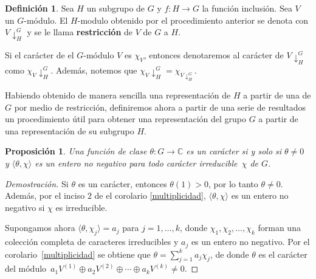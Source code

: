 \documentclass[12pt]{book}
\newtheorem{proposition}[theorem]{Proposición}
\theoremstyle{definition}
\newtheorem{definition}[theorem]{Definición}
\newcounter{in}
\newcounter{ini}
\begin{document}
\begin{definition}
  Sea $H$ un subgrupo de $G$ y $f:H\rightarrow G$ la función
  inclusión. Sea $V$ un $G$-módulo. El $H$-modulo obtenido por el
  procedimiento anterior se denota con $V\downarrow^{G}_{H}$ y se
  le llama \textbf{restricción} de $V$ de $G$ a $H$.
\end{definition}

Si el carácter de el $G$-módulo $V$ es $\chi_{V}$, entonces
denotaremos al carácter de $V\downarrow^{G}_{H}$ como
$\chi_{V}\downarrow^{G}_{H}$. Además, notemos que
$\chi_{V}\downarrow^{G}_{H}=\chi_{V\downarrow^{G}_{H}}$.

Habiendo obtenido de manera sencilla una representación de $H$ a
partir de una de $G$ por medio de restricción, definiremos ahora a
partir de una serie de resultados un procedimiento útil para obtener una
representación del grupo $G$ a partir de una representación de su
subgrupo $H$.


\begin{proposition}
\label{fun-cla-caracter}
Una función de clase $\theta:G\rightarrow\mathbb{C}$ es un carácter si
y solo si $\theta\neq 0$ y $\langle\theta,\chi\rangle$ es un entero no
negativo para todo carácter irreducible~$\chi$ de $G$. 
\end{proposition}
\begin{proof}[Demostración]
Si $\theta$ es un carácter, entonces $\theta(1)>0$, por lo tanto
$\theta\neq 0$. Además, por el inciso $2$ de el corolario
\ref{multiplicidad}, $\langle\theta,\chi\rangle$ es un entero no
negativo si $\chi$ es irreducible.

Supongamos ahora $\langle\theta,\chi_{j}\rangle=a_{j}$ para
$j=1,\ldots,k$, donde $\chi_{1},\chi_{2},\ldots,\chi_{k}$ forman una
colección completa de caracteres irreducibles y $a_{j}$ es un entero
no negativo. Por el corolario~\ref{multiplicidad} se obtiene que $\theta=\sum^{k}_{j=1}a_{j}\chi_{j}$, de donde
$\theta$ es el carácter del módulo~$a_{1}V^{(1)}\oplus
a_{2}V^{(2)}\oplus\cdots\oplus a_{k}V^{(k)}\neq 0$. 
\end{proof}
\end{document}
